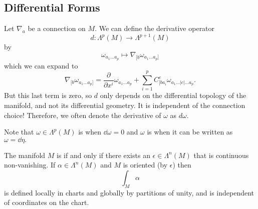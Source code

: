 \documentclass{article}
\numberwithin{equation}{section}
\begin{document}
\subsection{Differential Forms}
Let $\nabla_a$ be a connection on $M.$ We can define the derivative operator
\begin{equation*}
    d: \Lambda^p(M) \to \Lambda^{p+1}(M)
\end{equation*}
by 
\begin{equation*}
    \omega_{a_1\dots a_p} \mapsto \nabla_{[b}\omega_{a_1\dots a_p]}
\end{equation*}
which we can expand to 
\begin{equation*}
    \nabla_{[b}\omega_{a_1\dots a_p]} = \frac{\partial}{\partial x^i} \omega_{a_1 \dots a_p} + \sum_{i=1}^p C^c_{[ba_i}\omega_{a_1\dots |c|\dots a_p}.
\end{equation*}
But this last term is zero, so $d$ only depends on the differential topology of the manifold, and not its differential geometry. It is independent of the connection choice! Therefore, we often denote the derivative of $\omega$ as $d\omega.$

Note that $\omega \in \Lambda^p(M)$ is  when $\dd{\omega}=0$ and $\omega$ is  when it can be written as $\omega = \dd{\eta}.$

The manifold $M$ is  if and only if there exists an $\epsilon \in \Lambda^n(M)$ that is continuous non-vanishing. If $\alpha \in \Lambda^n(M)$ and $M$ is oriented (by $\epsilon$) then 
\begin{equation*}
    \int_M \alpha
\end{equation*}
is defined locally in charts and globally by partitions of unity, and is independent of coordinates on the chart.
\end{document}
